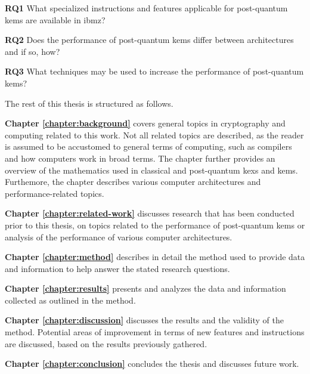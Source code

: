 \begin{description}
    \item \textbf{RQ1} What specialized instructions and features applicable for \gls{post-quantum} \acrlong{kem}s are available in \gls{ibmz}?\label{rq1}
    
    \item \textbf{RQ2} Does the performance of \gls{post-quantum} \acrlong{kem}s differ between architectures and if so, how?\label{rq2}
    
    \item \textbf{RQ3} What techniques may be used to increase the performance of \gls{post-quantum} \acrlong{kem}s?\label{rq3}
\end{description}

\noindent The rest of this thesis is structured as follows.

\begin{description}
    \item \textbf{Chapter \ref{chapter:background}} covers general topics in cryptography and computing related to this work. Not all related topics are described, as the reader is assumed to be accustomed to general terms of computing, such as compilers and how computers work in broad terms. The chapter further provides an overview of the mathematics used in classical and \gls{post-quantum} \glspl{kex} and \glspl{kem}. Furthemore, the chapter describes various computer architectures and performance-related topics.

    \item \textbf{Chapter \ref{chapter:related-work}} discusses research that has been conducted prior to this thesis, on topics related to the performance of \gls{post-quantum} \glspl{kem} or analysis of the performance of various computer architectures.
    
    \item \textbf{Chapter \ref{chapter:method}} describes in detail the method used to provide data and information to help answer the stated research questions.
    
    \item \textbf{Chapter \ref{chapter:results}} presents and analyzes the data and information collected as outlined in the method.
    
    \item \textbf{Chapter \ref{chapter:discussion}} discusses the results and the validity of the method. Potential areas of improvement in terms of new features and instructions are discussed, based on the results previously gathered.
    
    \item \textbf{Chapter \ref{chapter:conclusion}} concludes the thesis and discusses future work.
\end{description}